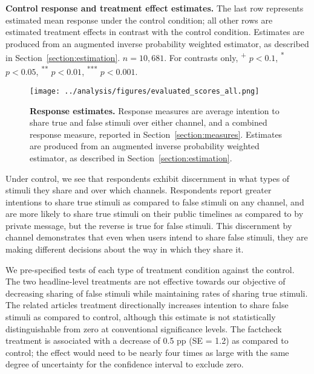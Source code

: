 \documentclass[letterpaper, 12pt, parskip=full,DIV=10]{scrartcl}
\begin{document}
\begin{table}[H]
{}
\caption{\textbf{Control response and treatment effect estimates.} The last row represents estimated mean response under the control condition; all other rows are estimated treatment effects in contrast with the control condition. Estimates are produced from an augmented inverse probability weighted estimator, as described in Section~\ref{section:estimation}. $n = 10,681$. For contrasts only, \textsuperscript{+} $p<0.1$, \textsuperscript{*} $p < 0.05$, \textsuperscript{**} $p < 0.01$, \textsuperscript{***} $p < 0.001$.} 
\label{tab:main_results}
\end{table}

\begin{figure}[H]
\texttt{[image: ../analysis/figures/evaluated\_scores\_all.png]}
\caption{\textbf{Response estimates.} Response measures are average intention to share true and false stimuli over either channel, and a combined response measure, reported in Section~\ref{section:measures}. Estimates are produced from an augmented inverse probability weighted estimator, as described in Section~\ref{section:estimation}.}
\label{fig:main_results}
\end{figure}

Under control, we see that respondents exhibit discernment in what types of stimuli they share and over which channels. Respondents report greater intentions to share true stimuli as compared to false stimuli on any channel, and are more likely to share true stimuli on their public timelines as compared to by private message, but the reverse is true for false stimuli. This discernment by channel demonstrates that even when users intend to share false stimuli, they are making different decisions about the way in which they share it. 

We pre-specified tests of each type of treatment condition against the control. The two headline-level treatments are not effective towards our objective of decreasing sharing of false stimuli while maintaining rates of sharing true stimuli. The related articles treatment directionally increases intention to share false stimuli as compared to control, although this estimate is not statistically distinguishable from zero at conventional significance levels. The factcheck treatment is associated with a decrease of 0.5 pp (SE = 1.2)  as compared to control; the effect would need to be nearly four times as large with the same degree of uncertainty for the confidence interval to exclude zero. 
\end{document}

